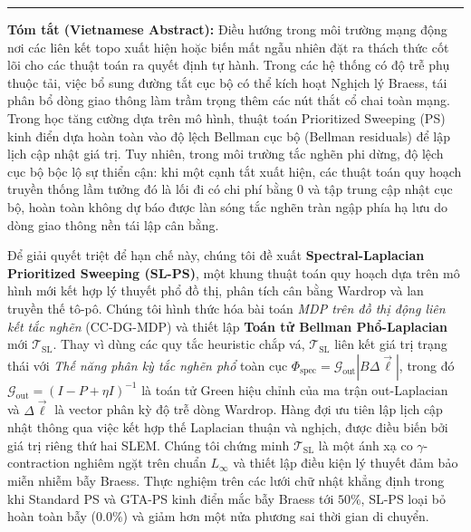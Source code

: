 \documentclass[11pt,a4paper]{article}
\begin{document}
\vspace{1em}
\begin{center}
\rule{0.8\textwidth}{0.4pt}
\end{center}
\vspace{0.5em}

\noindent\textbf{Tóm tắt (Vietnamese Abstract):}
Điều hướng trong môi trường mạng động nơi các liên kết topo xuất hiện hoặc biến mất ngẫu nhiên đặt ra thách thức cốt lõi cho các thuật toán ra quyết định tự hành. Trong các hệ thống có độ trễ phụ thuộc tải, việc bổ sung đường tắt cục bộ có thể kích hoạt Nghịch lý Braess, tái phân bổ dòng giao thông làm trầm trọng thêm các nút thắt cổ chai toàn mạng. Trong học tăng cường dựa trên mô hình, thuật toán Prioritized Sweeping (PS) kinh điển dựa hoàn toàn vào độ lệch Bellman cục bộ (Bellman residuals) để lập lịch cập nhật giá trị. Tuy nhiên, trong môi trường tắc nghẽn phi dừng, độ lệch cục bộ bộc lộ sự thiển cận: khi một cạnh tắt xuất hiện, các thuật toán quy hoạch truyền thống lầm tưởng đó là lối đi có chi phí bằng 0 và tập trung cập nhật cục bộ, hoàn toàn không dự báo được làn sóng tắc nghẽn tràn ngập phía hạ lưu do dòng giao thông nền tái lập cân bằng.

Để giải quyết triệt để hạn chế này, chúng tôi đề xuất \textbf{Spectral-Laplacian Prioritized Sweeping (SL-PS)}, một khung thuật toán quy hoạch dựa trên mô hình mới kết hợp lý thuyết phổ đồ thị, phân tích cân bằng Wardrop và lan truyền thế tô-pô. Chúng tôi hình thức hóa bài toán \textit{MDP trên đồ thị động liên kết tắc nghẽn} (CC-DG-MDP) và thiết lập \textbf{Toán tử Bellman Phổ-Laplacian} mới $\mathcal{T}_{\text{SL}}$. Thay vì dùng các quy tắc heuristic chắp vá, $\mathcal{T}_{\text{SL}}$ liên kết giá trị trạng thái với \textit{Thế năng phân kỳ tắc nghẽn phổ} toàn cục $\Phi_{\text{spec}} = \mathcal{G}_{\text{out}} |B \Delta \vec{\ell}|$, trong đó $\mathcal{G}_{\text{out}} = (I - P + \eta I)^{-1}$ là toán tử Green hiệu chỉnh của ma trận out-Laplacian và $\Delta \vec{\ell}$ là vector phân kỳ độ trễ dòng Wardrop. Hàng đợi ưu tiên lập lịch cập nhật thông qua việc kết hợp thế Laplacian thuận và nghịch, được điều biến bởi giá trị riêng thứ hai SLEM. Chúng tôi chứng minh $\mathcal{T}_{\text{SL}}$ là một ánh xạ co $\gamma$-contraction nghiêm ngặt trên chuẩn $L_\infty$ và thiết lập điều kiện lý thuyết đảm bảo miễn nhiễm bẫy Braess. Thực nghiệm trên các lưới chữ nhật khẳng định trong khi Standard PS và GTA-PS kinh điển mắc bẫy Braess tới $50\%$, SL-PS loại bỏ hoàn toàn bẫy ($0.0\%$) và giảm hơn một nửa phương sai thời gian di chuyển.
\end{document}
